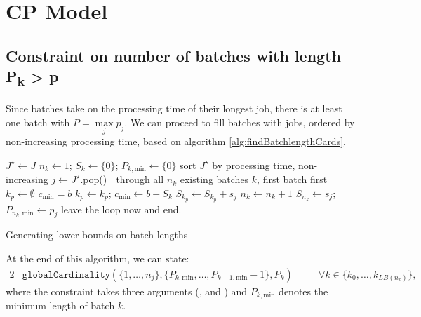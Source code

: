 \documentclass[13pt, letterpaper, oneside]{book}
\begin{document}
\section{CP Model} 
\subsection[Constraint on the number of batches with length $P_k >
p$]{Constraint on number of batches with length {\sansitalicfont
P\textsubscript{k}} > {\sansitalicfont p}}

Since batches take on the processing time of their longest job, there is at
least one batch with $P = \underset{j}{\max} p_j $. We can proceed to fill batches with jobs, ordered by non-increasing processing
time, based on algorithm \ref{alg:findBatchlengthCards}. 

\begin{algorithm}[h!]
\fontsize{9pt}{11.5pt}\selectfont \begin{algorithmic} \State $J^{\star} \gets J$
 \State $n_k \gets 1$; $S_k
\gets \{0\}$; $P_{k,\text{min}} \gets \{0\}$  \State sort $J^{\star}$ by processing time, non-increasing
\Repeat \State $j \gets J^{\star}$.pop()  \Loop $\;$ through all $n_k$ existing batches $k$, first
batch first \State $k_p \gets \emptyset$  \State
$c_\text{min} = b$   \State $k_p \gets k_p$; $c_\text{min} \gets
b-S_k$ \EndIf \EndLoop {} \State $S_{k_p} \gets S_{k_p} + s_j$
 \Else {} \State $n_k
\gets n_k + 1$ \State $S_{n_k} \gets s_j$;
$P_{n_k,\text{min}} \gets p_j$ 
\Else \State leave the loop now and end.  \EndIf \EndIf {} \end{algorithmic} \caption{Generating lower bounds on batch lengths}
\label{alg:findBatchlengthCards} \end{algorithm}
At the end of this algorithm, we can state: \begin{alignat}{2} &
\mathtt{globalCardinality}(\{1,\dots,n_j\},
\{P_{k,\text{min}}, \dots, P_{k-1,\text{min}} - 1\}, P_k) \quad && \forall k \in \{k_0,\dots,k_{LB(n_k)}\}, \end{alignat}
where the constraint takes three arguments (,  and ) and $P_{k,\text{min}}$ denotes the minimum length of batch $k$.
\end{document}
